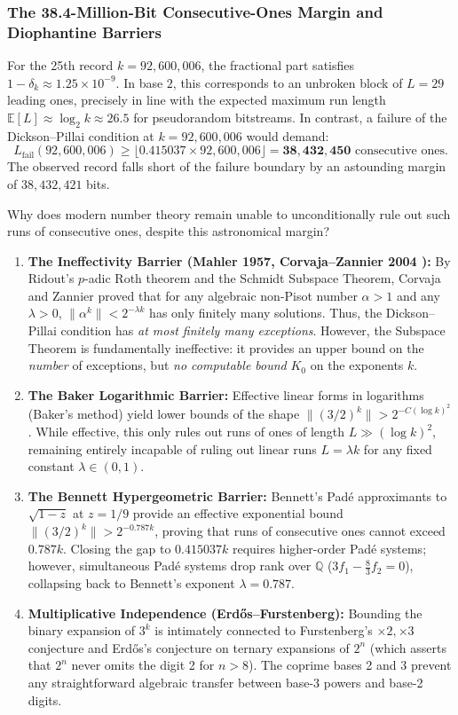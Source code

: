 \documentclass[11pt,reqno]{amsart}
\theoremstyle{definition}
\numberwithin{equation}{section}
\begin{document}
\subsubsection{The 38.4-Million-Bit Consecutive-Ones Margin and Diophantine Barriers}
For the 25th record $k = 92{,}600{,}006$, the fractional part satisfies $1 - \delta_k \approx 1.25 \times 10^{-9}$. In base $2$, this corresponds to an unbroken block of $L = 29$ leading ones, precisely in line with the expected maximum run length $\mathbb{E}[L] \approx \log_2 k \approx 26.5$ for pseudorandom bitstreams.
In contrast, a failure of the Dickson--Pillai condition at $k = 92{,}600{,}006$ would demand:
\[
L_{\mathrm{fail}}(92{,}600{,}006) \ge \lfloor 0.415037 \times 92{,}600{,}006 \rfloor = \mathbf{38{,}432{,}450} \text{ consecutive ones}.
\]
The observed record falls short of the failure boundary by an astounding margin of $38{,}432{,}421$ bits.

Why does modern number theory remain unable to unconditionally rule out such runs of consecutive ones, despite this astronomical margin?
\begin{enumerate}
    \item \textbf{The Ineffectivity Barrier (Mahler 1957, Corvaja--Zannier 2004 \cite{corvaja2004}):} By Ridout's $p$-adic Roth theorem and the Schmidt Subspace Theorem, Corvaja and Zannier proved that for any algebraic non-Pisot number $\alpha > 1$ and any $\lambda > 0$, $\|\alpha^k\| < 2^{-\lambda k}$ has only finitely many solutions. Thus, the Dickson--Pillai condition has \emph{at most finitely many exceptions}. However, the Subspace Theorem is fundamentally ineffective: it provides an upper bound on the \emph{number} of exceptions, but \emph{no computable bound} $K_0$ on the exponents $k$.
    \item \textbf{The Baker Logarithmic Barrier:} Effective linear forms in logarithms (Baker's method) yield lower bounds of the shape $\|(3/2)^k\| > 2^{-C (\log k)^2}$. While effective, this only rules out runs of ones of length $L \gg (\log k)^2$, remaining entirely incapable of ruling out linear runs $L = \lambda k$ for any fixed constant $\lambda \in (0, 1)$.
    \item \textbf{The Bennett Hypergeometric Barrier:} Bennett's Padé approximants \cite{bennett1994} to $\sqrt{1 - z}$ at $z = 1/9$ provide an effective exponential bound $\|(3/2)^k\| > 2^{-0.787 k}$, proving that runs of consecutive ones cannot exceed $0.787 k$. Closing the gap to $0.415037 k$ requires higher-order Padé systems; however, simultaneous Padé systems drop rank over $\mathbb{Q}$ ($3 f_1 - \frac{8}{3} f_2 = 0$), collapsing back to Bennett's exponent $\lambda = 0.787$.
    \item \textbf{Multiplicative Independence (Erd\H{o}s--Furstenberg):} Bounding the binary expansion of $3^k$ is intimately connected to Furstenberg's $\times 2, \times 3$ conjecture and Erd\H{o}s's conjecture on ternary expansions of $2^n$ (which asserts that $2^n$ never omits the digit 2 for $n > 8$). The coprime bases 2 and 3 prevent any straightforward algebraic transfer between base-3 powers and base-2 digits.
\end{enumerate}
\end{document}
